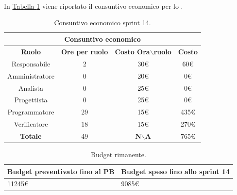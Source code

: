 In \hyperref[tab:sprint14_consuntivo_economico]{Tabella \ref{tab:sprint14_consuntivo_economico}} viene riportato il consuntivo economico per lo .
\begin{table}[H]
    \centering
    \begin{tabular}{|c|c|c|c|}
        \hline
            \multicolumn{4}{|c|}{\textbf{Consuntivo economico}} \\ 
        \hline
            \textbf{Ruolo} & \textbf{Ore per ruolo} & \textbf{Costo Ora$\backslash$ruolo} & \textbf{Costo} \\
        \hline
        Responsabile & 2 & 30€ & 60€ \\
        \hline
        Amministratore & 0 & 20€ & 0€ \\
        \hline
        Analista & 0 & 25€ & 0€ \\
        \hline
        Progettista & 0 & 25€ & 0€ \\
        \hline
        Programmatore & 29 & 15€ & 435€ \\
        \hline
        Verificatore & 18 & 15€ & 270€ \\
        \hline 
        \textbf{Totale} & 49 & \textbf{N$\backslash$A} & 765€  \\
        \hline
    \end{tabular}
    \caption{Consuntivo economico sprint 14.}
    \label{tab:sprint14_consuntivo_economico}
\end{table}

\begin{table}[H]
    \centering
    \begin{tabular}{| l | l |}
    \hline
    \textbf{Budget preventivato fino al PB} & \textbf{Budget speso fino allo sprint 14}\\
    \hline
        11245€ & 9085€ \\
    \hline
    \end{tabular}
    \caption{Budget rimanente.}
    \label{tab:budget_rimanente_sprint14}
\end{table}